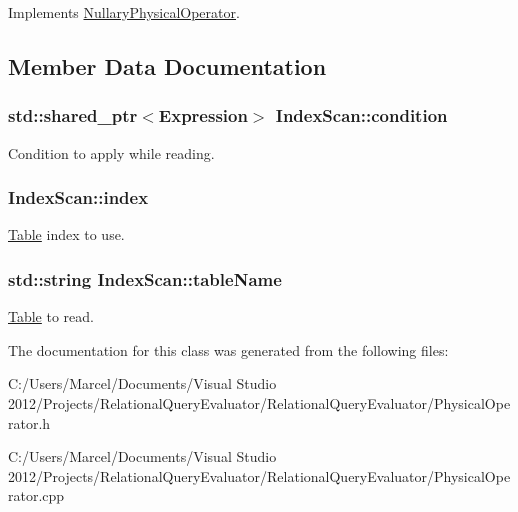 Implements \hyperlink{class_nullary_physical_operator_a053a51bc73b06d883fba982adeeb122c}{Nullary\+Physical\+Operator}.



\subsection{Member Data Documentation}
\hypertarget{class_index_scan_a9adcd1af97f3df02679f18fed687af21}{
\subsubsection[{condition}]{\setlength{\rightskip}{0pt plus 5cm}std\+::shared\+\_\+ptr$<${\bf Expression}$>$ Index\+Scan\+::condition}}\label{class_index_scan_a9adcd1af97f3df02679f18fed687af21}
Condition to apply while reading. \hypertarget{class_index_scan_a8ffc3e0a33fb2db655471ea28e47bc9e}{
\subsubsection[{index}]{ Index\+Scan\+::index}}\label{class_index_scan_a8ffc3e0a33fb2db655471ea28e47bc9e}
\hyperlink{class_table}{Table} index to use. \hypertarget{class_index_scan_a8557a6ffee853f05298881acf8bebe14}{
\subsubsection[{table\+Name}]{\setlength{\rightskip}{0pt plus 5cm}std\+::string Index\+Scan\+::table\+Name}}\label{class_index_scan_a8557a6ffee853f05298881acf8bebe14}
\hyperlink{class_table}{Table} to read. 

The documentation for this class was generated from the following files\+:\begin{DoxyCompactItemize}
\item 
C\+:/\+Users/\+Marcel/\+Documents/\+Visual Studio 2012/\+Projects/\+Relational\+Query\+Evaluator/\+Relational\+Query\+Evaluator/Physical\+Operator.\+h\item 
C\+:/\+Users/\+Marcel/\+Documents/\+Visual Studio 2012/\+Projects/\+Relational\+Query\+Evaluator/\+Relational\+Query\+Evaluator/Physical\+Operator.\+cpp\end{DoxyCompactItemize}
